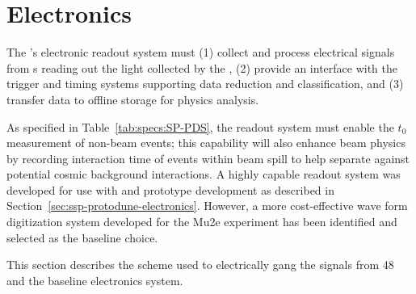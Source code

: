 
\section{Electronics}
\label{sec:fdsp-pd-pde}


The 's electronic readout system must (1) collect and process electrical signals from s reading out the light collected by the , (2) provide an interface with the trigger and timing systems supporting data reduction and classification, and (3) transfer data to offline storage for physics analysis.

As specified in Table~\ref{tab:specs:SP-PDS}, the readout system must enable the $t_0$ measurement of non-beam events; this capability will also enhance beam physics by recording interaction time of events within 
beam spill to help separate against potential cosmic background interactions. A highly capable readout system was developed for use with  and prototype development 
as described in Section~\ref{sec:ssp-protodune-electronics}. However, a more cost-effective wave form digitization system developed for the Mu2e experiment has been identified and selected as the baseline choice. 



This section describes the scheme used to electrically gang the signals from 48  and the baseline  electronics system.


